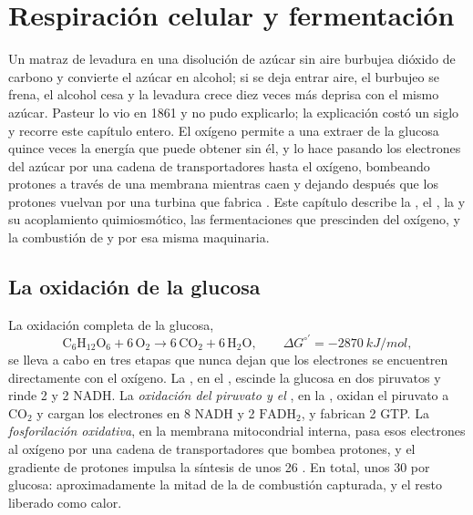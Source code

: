 \chapter{Respiración celular y fermentación}\label{ch:b1:respiration-fermentation}

Un matraz de levadura en una disolución de azúcar sin aire burbujea dióxido
de carbono y convierte el azúcar en alcohol; si se deja entrar aire, el
burbujeo se frena, el alcohol cesa y la levadura crece diez veces más
deprisa con el mismo azúcar. Pasteur lo vio en 1861 y no pudo explicarlo; la
explicación costó un siglo y recorre este capítulo entero. El oxígeno
permite a una  extraer de la glucosa quince veces la energía que puede
obtener sin él, y lo hace pasando los electrones del azúcar por una cadena
de transportadores hasta el oxígeno, bombeando protones a través de una
membrana mientras caen y dejando después que los protones vuelvan por una
turbina que fabrica . Este capítulo describe la , el , la  y su acoplamiento quimiosmótico, las
fermentaciones que prescinden del oxígeno, y la combustión de  y
 por esa misma maquinaria.

\section{La oxidación de la glucosa}

\begin{proposition}\label{prop:b1:respiration-fermentation:overview}
La oxidación completa de la glucosa,
\[
\mathrm{C_6H_{12}O_6} + 6\,\mathrm{O_2} \to 6\,\mathrm{CO_2} + 6\,\mathrm{H_2O},
\qquad \Delta G^{\circ\prime} = \qty{-2870}{kJ/mol},
\]
se lleva a cabo en tres etapas que nunca dejan que los electrones se
encuentren directamente con el oxígeno. La \emph{}, en el ,
escinde la glucosa en dos piruvatos y rinde 2  y 2 NADH. La
\emph{oxidación del piruvato y el }, en la , oxidan el piruvato a $\mathrm{CO_2}$ y cargan los electrones
en 8 NADH y 2 $\mathrm{FADH_2}$, y fabrican 2 GTP. La \emph{fosforilación
oxidativa}, en la membrana mitocondrial interna, pasa esos electrones al
oxígeno por una cadena de transportadores que bombea protones, y el
gradiente de protones impulsa la síntesis de unos 26 . En total, unos 30
 por glucosa: aproximadamente la mitad de la  de combustión
capturada, y el resto liberado como calor.
\end{proposition}

